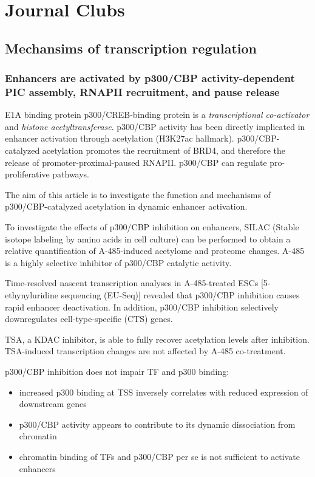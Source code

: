 \graphicspath{{chapters/_resources/}}

\chapter{Journal Clubs}

\section{Mechansims of transcription regulation}
\subsection{Enhancers are activated by p300/CBP activity-dependent PIC assembly, RNAPII recruitment, and pause release}

E1A binding protein p300/CREB-binding protein is a \emph{transcriptional co-activator} and \emph{histone acetyltransferase}. p300/CBP activity has been directly implicated in enhancer activation through acetylation (H3K27ac hallmark). p300/CBP-catalyzed acetylation promotes the recruitment of BRD4, and therefore the release of promoter-proximal-paused RNAPII. p300/CBP can regulate pro-proliferative pathways.

The aim of this article is to investigate the function and mechanisms of p300/CBP-catalyzed acetylation in dynamic enhancer activation.

To investigate the effects of p300/CBP inhibition on enhancers, SILAC (Stable isotope labeling by amino acids in cell culture) can be performed to obtain a relative quantification of A-485-induced acetylome and proteome changes. A-485 is a highly selective inhibitor of p300/CBP catalytic activity. 

Time-resolved nascent transcription analyses in A-485-treated ESCs [5-ethynyluridine sequencing (EU-Seq)] revealed that p300/CBP inhibition causes rapid enhancer deactivation. In addition, p300/CBP inhibition selectively downregulates cell-type-specific (CTS) genes.

TSA, a KDAC inhibitor, is able to fully recover acetylation levels after inhibition. TSA-induced transcription changes are not affected by A-485 co-treatment.

p300/CBP inhibition does not impair TF and p300 binding:
\begin{itemize}
\item increased p300 binding at TSS inversely correlates with reduced expression of downstream genes
\item p300/CBP activity appears to contribute to its dynamic dissociation from chromatin
\item chromatin binding of TFs and p300/CBP per se is not sufficient to activate enhancers
\end{itemize}

